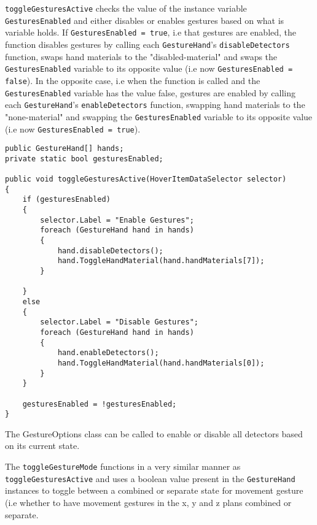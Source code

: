 \texttt{toggleGesturesActive} checks the value of the instance variable \texttt{GesturesEnabled} 
and either disables or enables gestures based on what is variable holds. If \texttt{GesturesEnabled = true}, i.e that gestures are enabled, the function 
disables gestures by calling each \texttt{GestureHand}'s \texttt{disableDetectors} function, swaps hand materials to the "disabled-material" and swaps the 
\texttt{GesturesEnabled} variable to its opposite value (i.e now \texttt{GesturesEnabled = false}). In the opposite case, i.e when the function is called and 
the \texttt{GesturesEnabled} variable has the value false, gestures are enabled by calling each \texttt{GestureHand}'s \texttt{enableDetectors} function, swapping
hand materials to the "none-material" and swapping the \texttt{GesturesEnabled} variable to its opposite value (i.e now \texttt{GesturesEnabled = true}). 

\begin{table}
\label{table:gesture_options_code}
\lstset{style=csharp}
\begin{lstlisting}
public GestureHand[] hands;
private static bool gesturesEnabled;

public void toggleGesturesActive(HoverItemDataSelector selector)
{
	if (gesturesEnabled)
	{
		selector.Label = "Enable Gestures";
		foreach (GestureHand hand in hands)
		{
			hand.disableDetectors();
			hand.ToggleHandMaterial(hand.handMaterials[7]);
		}

	}
	else
	{
		selector.Label = "Disable Gestures";
		foreach (GestureHand hand in hands)
		{
			hand.enableDetectors();
			hand.ToggleHandMaterial(hand.handMaterials[0]);
		}
	}

	gesturesEnabled = !gesturesEnabled;
}
\end{lstlisting}
\caption[The GestureOptions class]{The GestureOptions class can be called to enable or disable all detectors based on its current state.} 
\end{table}

The \texttt{toggleGestureMode} functions in a very similar manner as \texttt{toggleGesturesActive} and uses a boolean value present in the \texttt{GestureHand} instances
to toggle between a combined or separate state for movement gesture (i.e whether to have movement gestures in the x, y and z plans combined or separate.   

